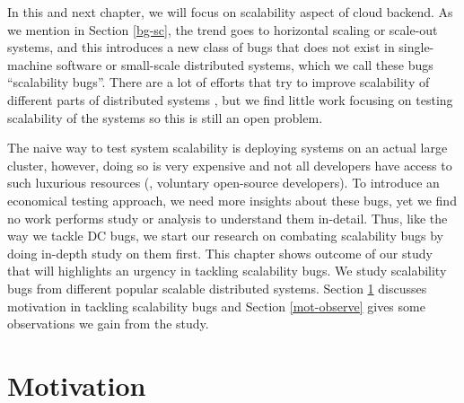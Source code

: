 In this and next chapter, we will focus on scalability aspect of cloud backend.
As we mention in Section \ref{bg-sc}, the trend goes to horizontal scaling or
scale-out systems, and this introduces a new class of bugs that does not exist
in single-machine software or small-scale distributed systems, which we call
these bugs ``scalability bugs''. 
%
There are a lot of efforts that try to improve scalability of different parts of
distributed systems \cite{Boutin+14-Apollo, Ousterhout+13-Sparrow,
Ganjam+15-C3Video, Glendenning+11-Scatter, Lloyd+11-COPS}, but we find little
work focusing on testing scalability of the systems \cite{Gupta+08-DieCast,
Wang+14-Exalt} so this is still an open problem.

The naive way to test system scalability is deploying systems on an actual large
cluster, however, doing so is very expensive and not all developers have access
to such luxurious resources (\eg, voluntary open-source developers). To
introduce an economical testing approach, we need more insights about these
bugs, yet we find no work performs study or analysis to understand them
in-detail. Thus, like the way we tackle DC bugs, we start our research on
combating scalability bugs by doing in-depth study on them first.
%
This chapter shows outcome of our study that will highlights an urgency in tackling
scalability bugs. We study \totAll scalability bugs from different popular
scalable distributed systems. Section \ref{sec-scb-mot} discusses motivation in
tackling scalability bugs and Section \ref{mot-observe} gives some observations
we gain from the study.
%

\section{Motivation}
\label{sec-scb-mot}

